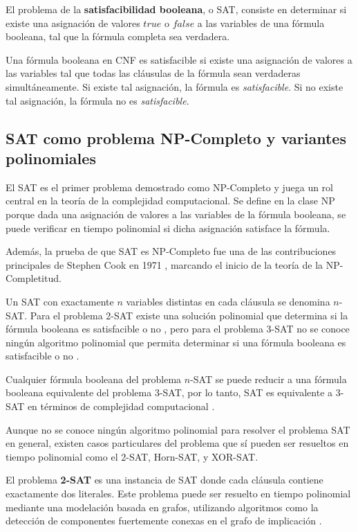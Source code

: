 \begin{definition}  
  El problema de la \textbf{satisfacibilidad booleana}, o SAT, consiste en determinar si existe una asignación de valores \( true \) o \( false \) a las variables de una fórmula booleana, tal que la fórmula completa sea verdadera. 
\end{definition}

Una fórmula booleana en CNF es satisfacible si existe una asignación de valores a las variables tal que todas las cláusulas de la fórmula sean verdaderas simultáneamente.
Si existe tal asignación, la fórmula es \textit{satisfacible}. Si no existe tal asignación, la fórmula no es \textit{satisfacible}.

\subsection{SAT como problema NP-Completo y variantes polinomiales}

El SAT es el primer problema demostrado como NP-Completo \cite{authomataTheory} y juega un rol central en la teoría de la complejidad computacional. Se define en la clase NP porque dada una asignación de valores a las variables de la fórmula booleana, se puede verificar en tiempo polinomial si dicha asignación satisface la fórmula.

Además, la prueba de que SAT es NP-Completo fue una de las contribuciones principales de Stephen Cook en 1971 \cite{Cook1971}, marcando el inicio de la teoría de la NP-Completitud.

Un SAT con exactamente $n$ variables distintas en cada cláusula se denomina $n$-SAT. Para el problema 2-SAT existe una solución polinomial que determina si la fórmula booleana es satisfacible o no \cite{2satbib}, pero para el problema 3-SAT no se conoce ningún algoritmo polinomial que permita
determinar si una fórmula booleana es satisfacible o no \cite{authomataTheory}.

Cualquier fórmula booleana del problema $n$-SAT se puede reducir a una fórmula booleana equivalente del problema 3-SAT,
por lo tanto, SAT es equivalente a 3-SAT en términos de complejidad computacional \cite{authomataTheory}.

Aunque no se conoce ningún algoritmo polinomial para resolver el problema SAT en general,
existen casos particulares del problema que sí pueden ser resueltos en tiempo polinomial como el 2-SAT, Horn-SAT, y XOR-SAT.


El problema \textbf{2-SAT} es una instancia de SAT donde cada cláusula contiene exactamente dos literales.  Este problema puede ser resuelto en tiempo polinomial mediante una modelación basada en grafos, utilizando algoritmos como la detección de componentes fuertemente conexas en el grafo de implicación \cite{2satbib}.

